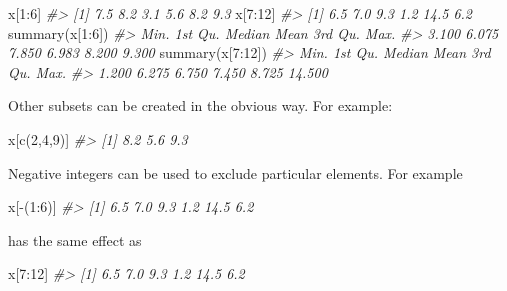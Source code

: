 \documentclass[
]{book}
\newenvironment{Shaded}{\begin{snugshade}}{\end{snugshade}}
\newcommand{\CommentTok}[1]{\textcolor[rgb]{0.56,0.35,0.01}{\textit{#1}}}
\newcommand{\DecValTok}[1]{\textcolor[rgb]{0.00,0.00,0.81}{#1}}
\newcommand{\FunctionTok}[1]{\textcolor[rgb]{0.00,0.00,0.00}{#1}}
\newcommand{\NormalTok}[1]{#1}
\newcommand{\SpecialCharTok}[1]{\textcolor[rgb]{0.00,0.00,0.00}{#1}}
\begin{document}
\begin{Shaded}
\begin{Highlighting}[]
\NormalTok{x[}\DecValTok{1}\SpecialCharTok{:}\DecValTok{6}\NormalTok{]}
\CommentTok{\#\textgreater{} [1] 7.5 8.2 3.1 5.6 8.2 9.3}
\NormalTok{x[}\DecValTok{7}\SpecialCharTok{:}\DecValTok{12}\NormalTok{]}
\CommentTok{\#\textgreater{} [1]  6.5  7.0  9.3  1.2 14.5  6.2}
\FunctionTok{summary}\NormalTok{(x[}\DecValTok{1}\SpecialCharTok{:}\DecValTok{6}\NormalTok{])}
\CommentTok{\#\textgreater{}    Min. 1st Qu.  Median    Mean 3rd Qu.    Max. }
\CommentTok{\#\textgreater{}   3.100   6.075   7.850   6.983   8.200   9.300}
\FunctionTok{summary}\NormalTok{(x[}\DecValTok{7}\SpecialCharTok{:}\DecValTok{12}\NormalTok{])}
\CommentTok{\#\textgreater{}    Min. 1st Qu.  Median    Mean 3rd Qu.    Max. }
\CommentTok{\#\textgreater{}   1.200   6.275   6.750   7.450   8.725  14.500}
\end{Highlighting}
\end{Shaded}

Other subsets can be created in the obvious way. For example:

\begin{Shaded}
\begin{Highlighting}[]
\NormalTok{x[}\FunctionTok{c}\NormalTok{(}\DecValTok{2}\NormalTok{,}\DecValTok{4}\NormalTok{,}\DecValTok{9}\NormalTok{)]}
\CommentTok{\#\textgreater{} [1] 8.2 5.6 9.3}
\end{Highlighting}
\end{Shaded}

Negative integers can be used to exclude particular elements. For example

\begin{Shaded}
\begin{Highlighting}[]
\NormalTok{x[}\SpecialCharTok{{-}}\NormalTok{(}\DecValTok{1}\SpecialCharTok{:}\DecValTok{6}\NormalTok{)]}
\CommentTok{\#\textgreater{} [1]  6.5  7.0  9.3  1.2 14.5  6.2}
\end{Highlighting}
\end{Shaded}

has the same effect as

\begin{Shaded}
\begin{Highlighting}[]
\NormalTok{x[}\DecValTok{7}\SpecialCharTok{:}\DecValTok{12}\NormalTok{]}
\CommentTok{\#\textgreater{} [1]  6.5  7.0  9.3  1.2 14.5  6.2}
\end{Highlighting}
\end{Shaded}
\end{document}
